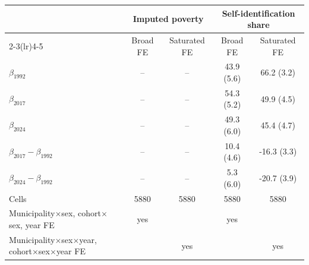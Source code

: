 \begin{tabular}{lcccc}
\toprule
 & \multicolumn{2}{c}{Imputed poverty} & \multicolumn{2}{c}{Self-identification share} \\
\cmidrule(lr){2-3}\cmidrule(lr){4-5}
 & Broad FE & Saturated FE & Broad FE & Saturated FE \\
\midrule
$\beta_{1992}$ & -- & -- & 43.9 (5.6) & 66.2 (3.2) \\
$\beta_{2017}$ & -- & -- & 54.3 (5.2) & 49.9 (4.5) \\
$\beta_{2024}$ & -- & -- & 49.3 (6.0) & 45.4 (4.7) \\
\midrule
$\beta_{2017}-\beta_{1992}$ & -- & -- & 10.4 (4.6) & -16.3 (3.3) \\
$\beta_{2024}-\beta_{1992}$ & -- & -- & 5.3 (6.0) & -20.7 (3.9) \\
\midrule
Cells & 5880 & 5880 & 5880 & 5880 \\
Municipality$\times$sex, cohort$\times$sex, year FE & yes & & yes & \\
Municipality$\times$sex$\times$year, cohort$\times$sex$\times$year FE & & yes & & yes \\
\bottomrule
\end{tabular}
